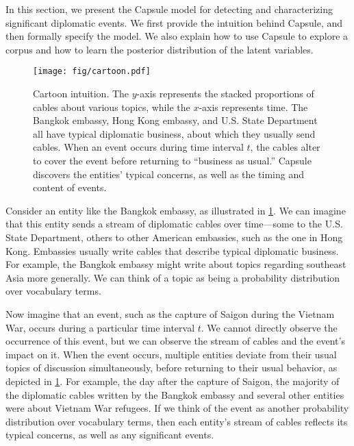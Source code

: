 
In this section, we present the Capsule model for detecting and
characterizing significant diplomatic events. We first provide the
intuition behind Capsule, and then formally specify the model. We also
explain how to use Capsule to explore a corpus and how to learn the
posterior distribution of the latent variables.

\begin{figure}
\centering
\texttt{[image: fig/cartoon.pdf]}
\caption{Cartoon intuition. The $y$-axis represents the stacked
  proportions of cables about various topics, while the $x$-axis
  represents time. The Bangkok embassy, Hong Kong embassy, and
  U.S. State Department all have typical diplomatic business, about
  which they usually send cables. When an event occurs during time
  interval $t$, the cables alter to cover the event before returning
  to ``business as usual.'' Capsule discovers the entities' typical
  concerns, as well as the timing and content of events.}
\label{fig:cartoon}
\end{figure}

Consider an entity like the Bangkok embassy, as illustrated in
\cref{fig:cartoon}. We can imagine that this entity sends a stream of
diplomatic cables over time---some to the U.S. State Department,
others to other American embassies, such as the one in Hong
Kong. Embassies usually write cables that describe typical diplomatic
business. For example, the Bangkok embassy might write about topics
regarding southeast Asia more generally. We can think of a topic as
being a probability distribution over vocabulary terms.

Now imagine that an event, such as the capture of Saigon during the
Vietnam War, occurs during a particular time interval $t$. We cannot
directly observe the occurrence of this event, but we can observe the
stream of cables and the event's impact on it. When the event occurs,
multiple entities deviate from their usual topics of discussion
simultaneously, before returning to their usual behavior, as depicted
in \cref{fig:cartoon}. For example, the day after the capture of
Saigon, the majority of the diplomatic cables written by the Bangkok
embassy and several other entities were about Vietnam War refugees. If
we think of the event as another probability distribution over
vocabulary terms, then each entity's stream of cables reflects its
typical concerns, as well as any significant events.


